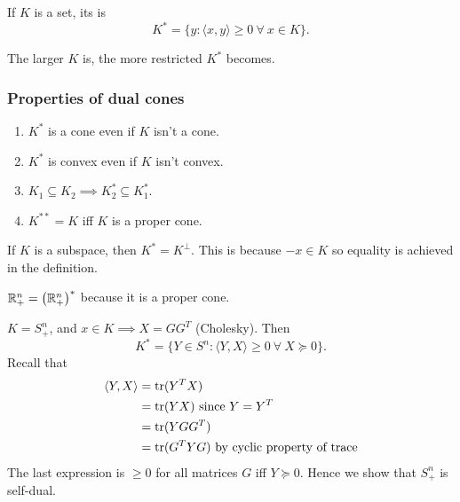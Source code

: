 \documentclass[class=article,crop=false]{standalone}
\begin{document}
\begin{defn}
If $ K$ is a set, its   is
\[
K^* = \{y: \langle x,y \rangle \geq 0 \ \forall \ x \in K\} 
.\] 
\end{defn}
\begin{note}
The larger $ K$ is, the more restricted  $ K^* $ becomes.
\end{note}
\subsubsection{Properties of dual cones}
\begin{enumerate}[label=\arabic*)]
	\item $ K^* $ is a cone even if $ K$ isn't a cone.
	\item  $ K^* $ is convex even if $ K$ isn't convex.
	\item  $ K_1 \subseteq K_2 \implies K_2^* \subseteq K_1^* $.
	\item $ K^{* *} =K$ iff $ K$ is a proper cone.
\end{enumerate}

\begin{eg}
If $ K$ is a subspace, then $ K^*  = K^\perp $. This is because $ -x \in K$ so equality is achieved in the definition.
\end{eg}

\begin{eg}
	$ \mathbb{R}_+^{n} = \left( \mathbb{R}_{+}^{n} \right)^*  $ because it is a proper cone.
\end{eg}

\begin{eg}
	$ K = S_{+}^{n}$, and $ x \in K \implies X = GG^{T}$ (Cholesky). Then
\[
K^*  = \{Y \in S^{n}: \langle Y,X \rangle \geq 0 \ \forall \ X \succeq 0\} 
.\] 
Recall that
\begin{align*}
	\langle Y,X \rangle &= \operatorname{tr}(Y^{T} X) \\
			    &= \operatorname{tr}(YX) \text{ since } Y=Y^{T} \\
			    &= \operatorname{tr}(YGG^{T}) \\
			    &= \operatorname{tr}(G^{T}YG) \text{ by cyclic property of trace} 
\end{align*}
The last expression is $ \geq 0$ for all matrices  $ G$ iff  $ Y \succeq 0$. Hence we show that  $ S_{+}^{n}$ is self-dual.
\end{eg}
\end{document}
